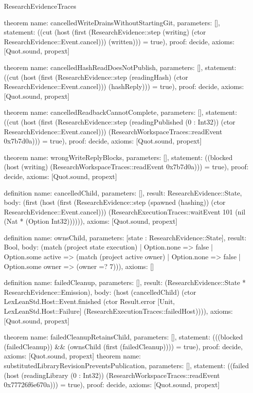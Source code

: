\begin{lexlean}{ResearchEvidenceTraces}
\begin{semanticmodule}
theorem{
 name: cancelledWriteDrainsWithoutStartingGit,
 parameters: [],
 statement: ((cut (host (first (ResearchEvidence::step (writing) (ctor ResearchEvidence::Event.cancel))) (written))) = true),
 proof: decide{},
 axioms: [Quot.sound, propext]
}

theorem{
 name: cancelledHashReadDoesNotPublish,
 parameters: [],
 statement: ((cut (host (first (ResearchEvidence::step (readingHash) (ctor ResearchEvidence::Event.cancel))) (hashReply))) = true),
 proof: decide{},
 axioms: [Quot.sound, propext]
}

theorem{
 name: cancelledReadbackCannotComplete,
 parameters: [],
 statement: ((cut (host (first (ResearchEvidence::step (readingPublished (0 : Int32)) (ctor ResearchEvidence::Event.cancel))) (ResearchWorkspaceTraces::readEvent 0x7b7d0a))) = true),
 proof: decide{},
 axioms: [Quot.sound, propext]
}

theorem{
 name: wrongWriteReplyBlocks,
 parameters: [],
 statement: ((blocked (host (writing) (ResearchWorkspaceTraces::readEvent 0x7b7d0a))) = true),
 proof: decide{},
 axioms: [Quot.sound, propext]
}

definition{
 name: cancelledChild,
 parameters: [],
 result: ResearchEvidence::State,
 body: (first (host (first (ResearchEvidence::step (spawned (hashing)) (ctor ResearchEvidence::Event.cancel))) (ResearchExecutionTraces::waitEvent 101 (nil (Nat * (Option Int32)))))),
 axioms: [Quot.sound, propext]
}

definition{
 name: ownsChild,
 parameters: [state : ResearchEvidence::State],
 result: Bool,
 body: (match (project state execution) | Option.none => false | Option.some active => (match (project active owner) | Option.none => false | Option.some owner => (owner =? 7))),
 axioms: []
}

definition{
 name: failedCleanup,
 parameters: [],
 result: (ResearchEvidence::State * ResearchEvidence::Emission),
 body: (host (cancelledChild) (ctor LexLeanStd.Host::Event.finished (ctor Result.error [Unit, LexLeanStd.Host::Failure] (ResearchExecutionTraces::failedHost)))),
 axioms: [Quot.sound, propext]
}

theorem{
 name: failedCleanupRetainsChild,
 parameters: [],
 statement: (((blocked (failedCleanup)) && (ownsChild (first (failedCleanup)))) = true),
 proof: decide{},
 axioms: [Quot.sound, propext]
}
theorem{
 name: substitutedLibraryRevisionPreventsPublication,
 parameters: [],
 statement: ((failed (host (readingLibrary (0 : Int32)) (ResearchWorkspaceTraces::readEvent 0x77726f6e670a))) = true),
 proof: decide{},
 axioms: [Quot.sound, propext]
}


\end{semanticmodule}
\end{lexlean}
